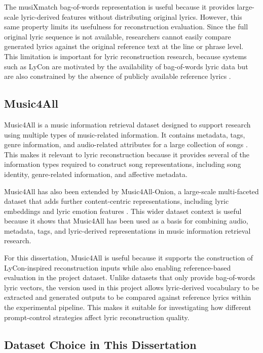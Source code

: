 The musiXmatch bag-of-words representation is useful because it provides large-scale lyric-derived features without distributing original lyrics. However, this same property limits its usefulness for reconstruction evaluation. Since the full original lyric sequence is not available, researchers cannot easily compare generated lyrics against the original reference text at the line or phrase level. This limitation is important for lyric reconstruction research, because systems such as LyCon are motivated by the availability of bag-of-words lyric data but are also constrained by the absence of publicly available reference lyrics \cite{kim2024lycon}.

\subsection{Music4All}

Music4All is a music information retrieval dataset designed to support research using multiple types of music-related information. It contains metadata, tags, genre information, and audio-related attributes for a large collection of songs \cite{domingues2020music4all}. This makes it relevant to lyric reconstruction because it provides several of the information types required to construct song representations, including song identity, genre-related information, and affective metadata.

Music4All has also been extended by Music4All-Onion, a large-scale multi-faceted dataset that adds further content-centric representations, including lyric embeddings and lyric emotion features \cite{moscati2022music4allonion}. This wider dataset context is useful because it shows that Music4All has been used as a basis for combining audio, metadata, tags, and lyric-derived representations in music information retrieval research.

For this dissertation, Music4All is useful because it supports the construction of LyCon-inspired reconstruction inputs while also enabling reference-based evaluation in the project dataset. Unlike datasets that only provide bag-of-words lyric vectors, the version used in this project allows lyric-derived vocabulary to be extracted and generated outputs to be compared against reference lyrics within the experimental pipeline. This makes it suitable for investigating how different prompt-control strategies affect lyric reconstruction quality.

\subsection{Dataset Choice in This Dissertation}

